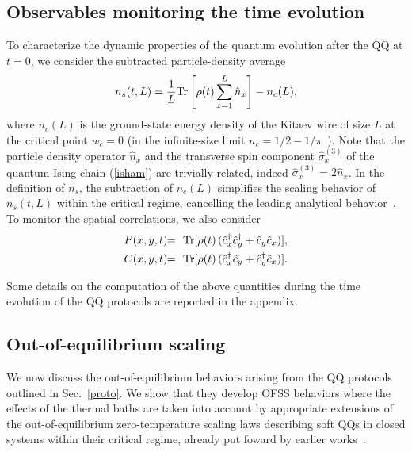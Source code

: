\subsection{Observables monitoring the time evolution}
\label{obs}


To characterize the dynamic properties of the quantum evolution after
the QQ at $t=0$, we consider the subtracted particle-density average
\begin{eqnarray}
n_s(t,L) = {1\over L} {\rm Tr} \left[ \rho(t) \sum_{x=1}^L \hat{n}_x \right]
- n_c(L),
 \label{ddef}
\end{eqnarray}
 where $n_c(L)$ is the ground-state energy density of the Kitaev wire
 of size $L$ at the critical point $w_c=0$ (in the infinite-size limit
 $n_c= 1/2 - 1/\pi$~\cite{Pfeuty-70}). Note that the particle density
 operator $\hat{n}_x$ and the transverse spin component
 $\hat\sigma_x^{(3)}$ of the quantum Ising chain (\ref{isham}) are
 trivially related, indeed $\hat{\sigma}_x^{(3)} = 2 \hat{n}_x$.  In
 the definition of $n_s$, the subtraction of $n_c(L)$ simplifies the
 scaling behavior of $n_s(t,L)$ within the critical regime, cancelling
 the leading analytical behavior~\cite{CPV-14,RV-21}. To monitor the
 spatial correlations, we also consider
\begin{eqnarray}
P(x,y,t) & \!\! = \!\! & {\rm Tr}[\rho(t)\,(\hat c_x^\dagger 
\hat c_{y}^\dagger +
    \hat c_{y} \hat c_{x})],\label{ptf}\\ 
C(x,y,t) & \!\! = \!\! & {\rm Tr}[\rho(t)\, (\hat c_x^\dagger \hat c_{y} 
+ \hat
    c_{y}^\dagger \hat c_{x})].\label{gtf} 
\end{eqnarray}

Some details on the computation of the above quantities during the
time evolution of the QQ protocols are reported in the appendix.


\subsection{Out-of-equilibrium scaling}
\label{scabeh}

We now discuss the out-of-equilibrium behaviors arising from the QQ
protocols outlined in Sec.~\ref{proto}.  We show that they develop
OFSS behaviors where the effects of the thermal baths are taken into
account by appropriate extensions of the out-of-equilibrium
zero-temperature scaling laws describing soft QQs in
closed systems within their critical regime, already put foward by
earlier works~\cite{PRV-18,RV-21}.

